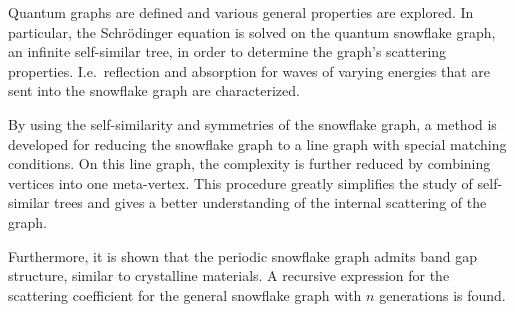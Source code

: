 Quantum graphs are defined and various general properties are explored. In particular, the Schrödinger equation is solved on the quantum snowflake graph, an infinite self-similar tree, in order to determine the graph's scattering properties. I.e.\ reflection and absorption for waves of varying energies that are sent into the snowflake graph are characterized.

By using the self-similarity and symmetries of the snowflake graph, a method is developed for reducing the snowflake graph to a line graph with special matching conditions. On this line graph, the complexity is further reduced by combining vertices into one meta-vertex. This procedure greatly simplifies the study of self-similar trees and gives a better understanding of the internal scattering of the graph.

Furthermore, it is shown that the periodic snowflake graph admits band gap structure, similar to crystalline materials. A recursive expression for the scattering coefficient for the general snowflake graph with $n$ generations is found.
